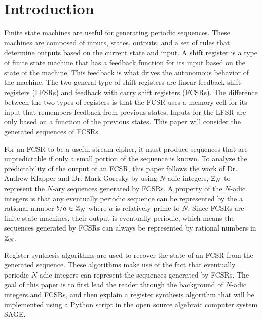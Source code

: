 \section{Introduction}
\par Finite state machines are useful for generating
periodic sequences. These machines are composed of
inputs, states, outputs, and a set of rules that
determine outputs based on the current state and input.
A shift register is a type of finite state machine that
has a feedback function for its input based on the state
of the machine. This feedback is what drives the autonomous
behavior of the machine. The two general type of shift
registers are linear feedback shift registers (LFSRs) and
feedback with carry shift registers (FCSRs). The difference
between the two types of registers is that the FCSR uses
a memory cell for its input that remembers feedback from
previous states. Inputs for the LFSR are only based on a
function of the previous states. This paper will consider
the generated sequences of FCSRs.

\par For an FCSR to be a useful stream cipher, it must
produce sequences that are unpredictable if only a small
portion of the sequence is known. To analyze the
predictability of the output of an FCSR, this paper follows
the work of Dr. Andrew Klapper and Dr. Mark Goresky by using
$N$-adic integers, $\mathbb{Z}_N$ to represent the $N$-ary sequences
generated by FCSRs. A property of the $N$-adic integers
is that any eventually periodic sequence can be represented
by the a rational number $b/a\in\mathbb{Z}_N$ where $a$ is
relatively prime to $N$. Since FCSRs are finite state
machines, their output is eventually periodic, which means
the sequences generated by FCSRs can always be represented
by rational numbers in $\mathbb{Z}_N$.

\par Register synthesis algorithms are used to recover the
state of an FCSR from the generated sequence. These
algorithms make use of the fact that eventually periodic
$N$-adic integers can represent the sequences generated by
FCSRs. The goal of this paper is to first lead the reader through
the background of $N$-adic integers and FCSRs, and then
explain a register synthesis algorithm that will be
implemented using a Python script in the open source
algebraic computer system SAGE.

